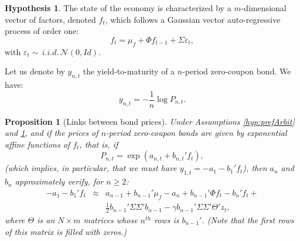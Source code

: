 \documentclass[
  12pt,
]{book}
\newtheorem{proposition}{Proposition}[chapter]
\theoremstyle{definition}
\theoremstyle{definition}
\theoremstyle{definition}
\theoremstyle{definition}
\newtheorem{hypothesis}{Hypothesis}[chapter]
\theoremstyle{remark}
\begin{document}
\begin{hypothesis}
\protect\hypertarget{hyp:dynF}{}\label{hyp:dynF}The state of the economy is characterized by a \(m\)-dimensional vector of factors, denoted \(f_t\), which follows a Gaussian vector auto-regressive process of order one:
\[
f_t = \mu_f + \Phi f_{t-1} + \Sigma \varepsilon_t,
\]
with \(\varepsilon_t \sim\,i.i.d.\,\mathcal{N}(0,Id)\).
\end{hypothesis}

Let us denote by \(y_{n,t}\) the yield-to-maturity of a \(n\)-period zero-coupon bond. We have:
\begin{equation}
y_{n,t} = - \frac{1}{n}\log P_{n,t}.\label{eq:Pandy}
\end{equation}

\begin{proposition}[Links between bond prices]
\protect\hypertarget{prp:prop111}{}\label{prp:prop111}Under Assumptions \ref{hyp:prefArbit} and \ref{hyp:dynF}, and if the prices of \(n\)-period zero-coupon bonds are given by exponential affine functions of \(f_t\), that is, if
\begin{equation}
P_{n,t} = \exp(a_{n,t} + b_{n,t}'f_t), \label{eq:PPs}    
\end{equation}
(which implies, in particular, that we must have \(y_{1,t} = - a_1 - b_1'f_t\)), then \(a_n\) and \(b_n\) approximately verify, for \(n \ge 2\):
\begin{eqnarray}
-a_1-b_1' f_t &\approx& a_{n-1} + b_{n-1}'\mu_f  - a_{n} + b_{n-1}'\Phi f_t - b_{n}'f_{t} + \nonumber \\ &&\frac{1}{2}b_{n-1}'\Sigma \Sigma'b_{n-1} - \gamma b_{n-1}'\Sigma\Sigma'\Theta' z_t, \label{eq:Lagr1B}
\end{eqnarray}
where \(\Theta\) is an \(N \times m\) matrices whose \(n^{th}\) rows is \(b_{n-1}'\). (Note that the first rows of this matrix is filled with zeros.)
\end{proposition}
\end{document}
